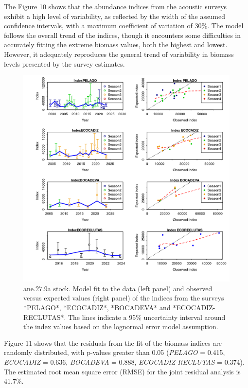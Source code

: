 \documentclass[
]{article}
\begin{document}
The Figure 10 shows that the abundance indices from the acoustic surveys
exhibit a high level of variability, as reflected by the width of the
assumed confidence intervals, with a maximum coefficient of variation of
30\%. The model follows the overall trend of the indices, though it
encounters some difficulties in accurately fitting the extreme biomass
values, both the highest and lowest. However, it adequately reproduces
the general trend of variability in biomass levels presented by the
survey estimates.

\begin{figure}[H]

{\centering \includegraphics[width=0.95\linewidth]{report/run/S1.0_4FLEETS/fig_indices_fit} 

}

\caption{ane.27.9a stock. Model fit to the data (left panel) and observed versus expected values (right panel) of the indices from the surveys *PELAGO*, *ECOCADIZ*, *BOCADEVA* and *ECOCADIZ-RECLUTAS*. The lines indicate a 95\% uncertainty interval around the index values based on the lognormal error model assumption. }\label{fig:unnamed-chunk-14}
\end{figure}

Figure 11 shows that the residuals from the fit of the biomass indices
are randomly distributed, with p-values greater than 0.05 (\emph{PELAGO}
= 0.415, \emph{ECOCADIZ} = 0.636, \emph{BOCADEVA} = 0.888,
\emph{ECOCADIZ-RECLUTAS} = 0.374). The estimated root mean square error
(RMSE) for the joint residual analysis is 41.7\%.
\end{document}
